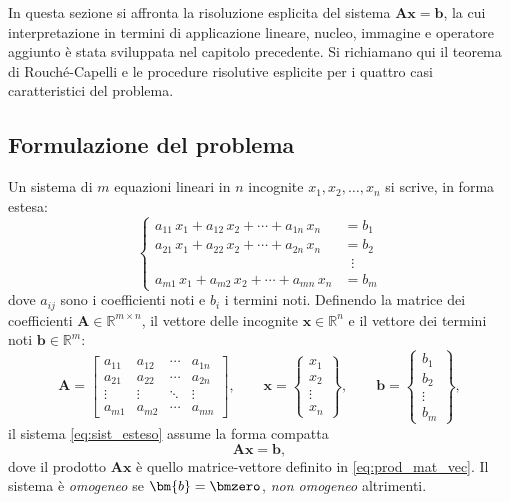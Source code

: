 In questa sezione si affronta la risoluzione esplicita del sistema
$\bm{A}\bm{x}=\bm{b}$, la cui interpretazione in termini di
applicazione lineare, nucleo, immagine e operatore aggiunto \`e
stata sviluppata nel capitolo precedente. Si richiamano qui il
teorema di Rouch\'e-Capelli e le procedure risolutive esplicite per
i quattro casi caratteristici del problema.


\subsection{Formulazione del problema}

Un sistema di $m$ equazioni lineari in $n$ incognite $x_1, x_2, \ldots, x_n$ si scrive, in forma estesa:
\begin{equation}\label{eq:sist_esteso}
	\left\{
	\begin{aligned}
		a_{11}\,x_1 + a_{12}\,x_2 + \cdots + a_{1n}\,x_n &= b_1 \\
		a_{21}\,x_1 + a_{22}\,x_2 + \cdots + a_{2n}\,x_n &= b_2 \\
		&\;\;\vdots \\
		a_{m1}\,x_1 + a_{m2}\,x_2 + \cdots + a_{mn}\,x_n &= b_m
	\end{aligned}
	\right.
\end{equation}
dove $a_{ij}$ sono i coefficienti noti e $b_i$ i termini noti. Definendo la matrice dei coefficienti $\bm{A}\in\mathbb{R}^{m\times n}$, il vettore delle incognite $\bm{x} \in \mathbb{R}^{n}$ e il vettore dei termini noti $\bm{b} \in \mathbb{R}^{m}$:
\begin{equation}
	\bm{A}=\begin{bmatrix}
		a_{11} & a_{12} & \cdots & a_{1n}\\
		a_{21} & a_{22} & \cdots & a_{2n}\\
		\vdots & \vdots & \ddots & \vdots\\
		a_{m1} & a_{m2} & \cdots & a_{mn}
	\end{bmatrix}, \qquad
	\bm{x}=\begin{Bmatrix} x_{1}\\ x_{2}\\ \vdots \\ x_{n} \end{Bmatrix}, \qquad
	\bm{b}=\begin{Bmatrix} b_{1}\\ b_{2}\\ \vdots \\ b_{m} \end{Bmatrix},
\end{equation}
il sistema \eqref{eq:sist_esteso} assume la forma compatta
\begin{equation}\label{eq:sist_lin}
	\bm{A}\bm{x} = \bm{b},
\end{equation}
dove il prodotto $\bm{A}\bm{x}$ \`e quello matrice-vettore definito in \eqref{eq:prod_mat_vec}. Il sistema \`e \textit{omogeneo} se $\bm{b}=\bmzero$, \textit{non omogeneo} altrimenti.

